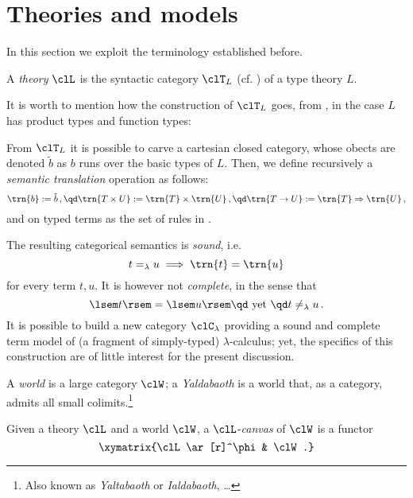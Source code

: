 \section{Theories and models}
\label{sec:orge02f333}
In this section we exploit the terminology established before.
\begin{definition}[Theory]\label{teoria}
	A \emph{theory} $\clL$ is the syntactic category $\clT_L$ (cf. \cite{lambek1988introduction}) of a type theory $L$.
\end{definition}
It is worth to mention how the construction of $\clT_L$ goes, from \cite{lambek1988introduction,abramskyno}, in the case $L$ has product types and function types:

From $\clT_L$ it is possible to carve a cartesian closed category, whose obects are denoted $\tilde{b}$ as $b$ runs over the basic types of $L$. Then, we define recursively a \emph{semantic translation} operation as follows:
\[ \trn{b}:=\tilde{b} \,,\qd \trn{T\times U}:=\trn{T}\times\trn{U} \,,\qd \trn{T\to U}:=\trn{T}\Rightarrow\trn{U}\,, \]
and on typed terms as the set of rules in \cite[1.6.5]{abramskyno}.

The resulting categorical semantics is \emph{sound}, i.e.
\[ t=_\lambda u \implies \trn{t}=\trn{u} \]
for every term $t,u$. It is however not \emph{complete}, in the sense that
\[ \lsem t \rsem = \lsem u \rsem \text{\qd yet \qd} t\neq_\lambda u\,. \]
It is possible to build a new category $\clC_\lambda$ providing a sound and complete term model of (a fragment of simply-typed) $\lambda$-calculus; yet, the specifics of this construction are of little interest for the present discussion.
\begin{definition}\label{mondo_yalda}
	A \emph{world} is a large category $\clW$; a \emph{Yaldabaoth} is a world that, as a category, admits all small colimits.\footnote{Also known as \emph{Yaltabaoth} or \emph{Ialdabaoth}, \dots}
\end{definition}
Given a theory $\clL$ and a world $\clW$, a $\clL$-\emph{canvas} of $\clW$ is a functor
\[\xymatrix{\clL \ar[r]^\phi & \clW.}\]

